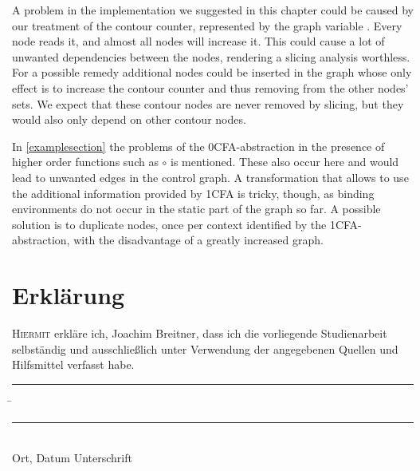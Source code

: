 \documentclass[a4paper,halfparskip,DIV=10,11pt]{scrbook}
\begin{document}
A problem in the implementation we suggested in this chapter could be caused by our treatment of the contour counter, represented by the graph variable . Every node reads it, and almost all nodes will increase it. This could cause a lot of unwanted dependencies between the nodes, rendering a slicing analysis worthless. For a possible remedy additional nodes could be inserted in the graph whose only effect is to increase the contour counter and thus removing  from the other nodes’  sets. We expect that these contour nodes are never removed by slicing, but they would also only depend on other contour nodes.

In \cref{examplesection} the problems of the 0CFA-abstraction in the presence of higher order functions such as $\circ$ is mentioned. These also occur here and would lead to unwanted edges in the control graph. A transformation that allows to use the additional information provided by 1CFA is tricky, though, as binding environments do not occur in the static part of the graph so far. A possible solution is to duplicate nodes, once per context identified by the 1CFA-abstraction, with the disadvantage of a greatly increased graph.


\appendix

{
\raggedright

}
\chapter*{Erklärung}

\lettrine H{iermit} erkläre ich, Joachim Breitner, dass ich die vorliegende Studienarbeit selb\-ständig
und ausschließlich unter Verwendung der angegebenen Quellen und Hilfsmittel verfasst
habe.
\vspace{20mm}
\begin{tabbing}
\rule{4cm}{.4pt}\hspace{1cm} \= \rule{7cm}{.4pt} \\
Ort, Datum \> Unterschrift
\end{tabbing}
\end{document}
